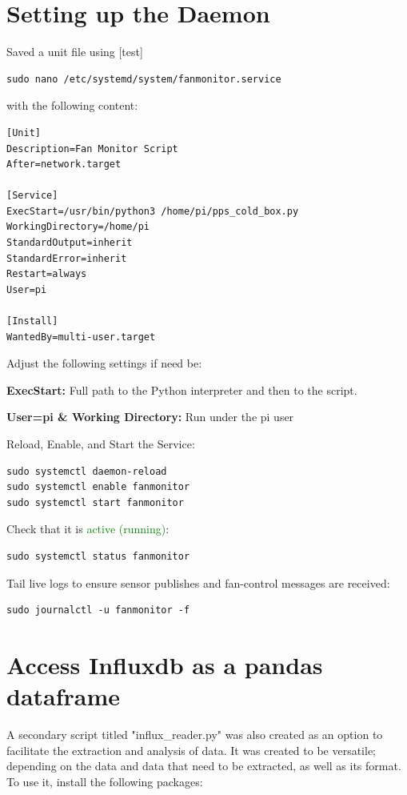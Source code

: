 \documentclass[onecolumn]{article}
\begin{document}
\newpage

\section{Setting up the Daemon}

Saved a unit file using [test] 

\begin{lstlisting}[numbers=none]
    sudo nano /etc/systemd/system/fanmonitor.service
\end{lstlisting}
    
with the following content:\\


\begin{lstlisting}[numbers=none]
[Unit]
Description=Fan Monitor Script
After=network.target

[Service]
ExecStart=/usr/bin/python3 /home/pi/pps_cold_box.py
WorkingDirectory=/home/pi
StandardOutput=inherit
StandardError=inherit
Restart=always
User=pi

[Install]
WantedBy=multi-user.target
\end{lstlisting}

Adjust the following settings if need be:\\
\small

\textbf{ExecStart:} Full path to the Python interpreter and then to the script.

\textbf{User=pi \& Working Directory:} Run under the pi user

\normalsize

Reload, Enable, and Start the Service:
\begin{lstlisting}[numbers=none]
sudo systemctl daemon-reload
sudo systemctl enable fanmonitor
sudo systemctl start fanmonitor
\end{lstlisting}

Check that it is \textcolor{green}{active (running)}:

\begin{lstlisting}[numbers=none]
    sudo systemctl status fanmonitor
\end{lstlisting}


Tail live logs to ensure sensor publishes and fan-control messages are received:

\begin{lstlisting}[numbers=none]
    sudo journalctl -u fanmonitor -f
\end{lstlisting}

\section{Access Influxdb as a pandas dataframe}
A secondary script titled "influx\_reader.py" was also created as an option to facilitate the extraction and analysis of data. It was created to be versatile; depending on the data and data that need to be extracted, as well as its format. To use it, install the following packages:
\end{document}
